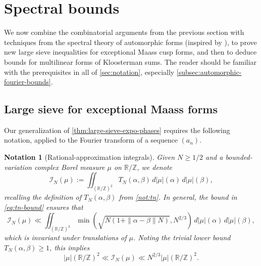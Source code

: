 \documentclass[reqno,11pt]{amsart}
\newtheorem{notation}[theorem]{Notation}
\theoremstyle{remark}
\numberwithin{equation}{section}
\newcommand{\Z}{\mathbb{Z}}
\newcommand{\R}{\mathbb{R}}
\newcommand{\mI}{\mathcal{I}}
\begin{document}
\section{Spectral bounds}
\label{sec:spectral}

We now combine the combinatorial arguments from the previous section with techniques from the spectral theory of automorphic forms (inspired by \cite{deshouillers1982kloosterman}), to prove new large sieve inequalities for exceptional Maass cusp forms, and then to deduce bounds for multilinear forms of Kloosterman sums. The reader should be familiar with the prerequisites in all of \cref{sec:notation}, especially \cref{subsec:automorphic-fourier-bounds}.

\subsection{Large sieve for exceptional Maass forms}
\label{subsec:large-sieve}
Our generalization of \cref{thm:large-sieve-expo-phases} requires the following notation, applied to the Fourier transform of a sequence $(a_n)$. 

\begin{notation}[Rational-approximation integrals] \label{not:concentration}
Given $N \ge 1/2$ and a bounded-variation complex Borel measure $\mu$ on $\R/\Z$, we denote
\[
    \mI_N(\mu) := \iint_{(\R/\Z)^2} T_N(\alpha, \beta)\,
        d|\mu|(\alpha)\, d|\mu|(\beta),
\]
recalling the definition of $T_N(\alpha, \beta)$ from \cref{not:tn}.
In general, the bound in \cref{eq:tn-bound} ensures that
\begin{equation} \label{eq:I-bound-1}
    \mI_N(\mu) \ll \iint_{(\R/\Z)^2} \min \left(\sqrt{N(1 + \|\alpha-\beta\| N)}, N^{2/3} \right)\,
        d|\mu|(\alpha)\, d|\mu|(\beta),
\end{equation}
which is invariant under translations of $\mu$. Noting the trivial lower bound $T_N(\alpha, \beta) \ge 1$, this implies
\begin{equation} \label{eq:I-bound-2}
    |\mu|(\R/\Z)^2 \ll \mI_N(\mu) \ll 
    N^{2/3} |\mu|(\R/\Z)^2.
\end{equation}
\end{notation}
\end{document}
